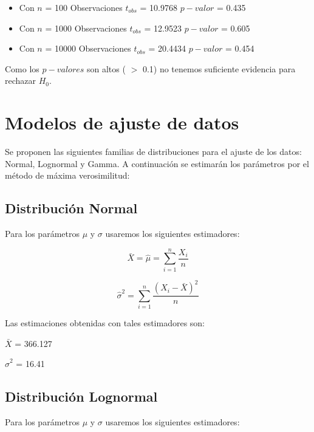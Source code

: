 \documentclass[a4paper,10pt]{article}
\begin{document}
\begin{itemize}
 \item Con $n$ = 100 Observaciones
 \subitem $t_{obs}$ = 10.9768
 \subitem $p-valor$ = 0.435
 \item Con $n$ = 1000 Observaciones
 \subitem $t_{obs}$ = 12.9523
 \subitem $p-valor$ = 0.605
 \item Con $n$ = 10000 Observaciones
 \subitem $t_{obs}$ = 20.4434
 \subitem $p-valor$ = 0.454
\end{itemize}

Como los $p-valores$ son altos ( $>$ 0.1) no tenemos suficiente evidencia para rechazar $H_0$.

\pagebreak

\section*{Modelos de ajuste de datos}

Se proponen las siguientes familias de distribuciones para el ajuste de los datos: Normal, Lognormal y Gamma.
A continuación se estimarán los parámetros por el método de máxima verosimilitud:

\subsection*{Distribución Normal}

Para los parámetros $\mu$ y $\sigma$ usaremos los siguientes estimadores:

\vspace{0.4in}

\[\bar{X} = \hat{\mu} = \sum\limits_{i=1}^n \frac{X_i}{n}\]


\[\hat{\sigma}^2 = \sum\limits_{i=1}^n \frac{(X_i - \bar{X})^2}{n}\]

\vspace{0.4in}
Las estimaciones obtenidas con tales estimadores son:
\vspace{0.4in}


$\bar{X}$ = 366.127

\vspace{0.1in}
$\hat{\sigma}^2$ = 16.41


\subsection*{Distribución Lognormal}
Para los parámetros $\mu$ y $\sigma$ usaremos los siguientes estimadores:

\vspace{0.4in}
\end{document}
